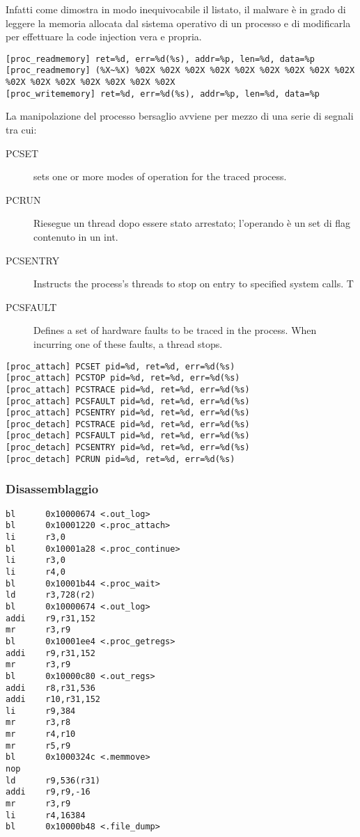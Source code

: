 \documentclass[10pt,a4paper, titlepage]{report}
\begin{document}
Infatti come dimostra in modo inequivocabile il listato, il malware è in grado di leggere la memoria allocata dal sistema operativo di un processo e di modificarla per effettuare la code injection vera e propria.

\begin{lstlisting}
[proc_readmemory] ret=%d, err=%d(%s), addr=%p, len=%d, data=%p
[proc_readmemory] (%X~%X) %02X %02X %02X %02X %02X %02X %02X %02X %02X %02X %02X %02X %02X %02X %02X %02X
[proc_writememory] ret=%d, err=%d(%s), addr=%p, len=%d, data=%p
\end{lstlisting}

La manipolazione del processo bersaglio avviene per mezzo di una serie di segnali tra cui:


\begin{description}

\item[PCSET] sets one or more modes of operation for the traced process. 
\item[PCRUN] Riesegue un thread dopo essere stato arrestato; l'operando è un set di flag contenuto in un int.
\item[PCSENTRY] Instructs the process's threads to stop on entry to specified system calls. T
\item[PCSFAULT]Defines a set of hardware faults to be traced in the process. When incurring one of these faults, a thread stops.

\end{description}


\begin{lstlisting}
[proc_attach] PCSET pid=%d, ret=%d, err=%d(%s)
[proc_attach] PCSTOP pid=%d, ret=%d, err=%d(%s)
[proc_attach] PCSTRACE pid=%d, ret=%d, err=%d(%s)
[proc_attach] PCSFAULT pid=%d, ret=%d, err=%d(%s)
[proc_attach] PCSENTRY pid=%d, ret=%d, err=%d(%s)
[proc_detach] PCSTRACE pid=%d, ret=%d, err=%d(%s)
[proc_detach] PCSFAULT pid=%d, ret=%d, err=%d(%s)
[proc_detach] PCSENTRY pid=%d, ret=%d, err=%d(%s)
[proc_detach] PCRUN pid=%d, ret=%d, err=%d(%s)
\end{lstlisting}


\subsubsection{Disassemblaggio}

\begin{lstlisting}
bl      0x10000674 <.out_log>
bl      0x10001220 <.proc_attach>
li      r3,0
bl      0x10001a28 <.proc_continue>
li      r3,0
li      r4,0
bl      0x10001b44 <.proc_wait>
ld      r3,728(r2)
bl      0x10000674 <.out_log>
addi    r9,r31,152
mr      r3,r9
bl      0x10001ee4 <.proc_getregs>
addi    r9,r31,152
mr      r3,r9
bl      0x10000c80 <.out_regs>
addi    r8,r31,536
addi    r10,r31,152
li      r9,384
mr      r3,r8
mr      r4,r10
mr      r5,r9
bl      0x1000324c <.memmove>
nop
ld      r9,536(r31)
addi    r9,r9,-16
mr      r3,r9
li      r4,16384
bl      0x10000b48 <.file_dump>
\end{lstlisting}
\end{document}
